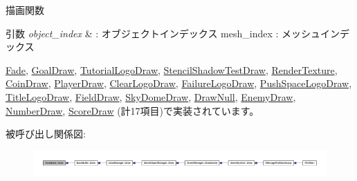 描画関数 


\begin{DoxyParams}{引数}
{\em object\+\_\+index} & \+: オブジェクトインデックス mesh\+\_\+index \+: メッシュインデックス \\
\hline
\end{DoxyParams}


\mbox{\hyperlink{class_fade_a84a9e688650ac500e03cde74ff0210b8}{Fade}}, \mbox{\hyperlink{class_goal_draw_a554c826d7a4534ee489dfe18edf7ee0e}{Goal\+Draw}}, \mbox{\hyperlink{class_tutorial_logo_draw_aa808cfb8bc59d58bbd698a195603429f}{Tutorial\+Logo\+Draw}}, \mbox{\hyperlink{class_stencil_shadow_test_draw_abb5f9445b7d94c213a3751fa57e36643}{Stencil\+Shadow\+Test\+Draw}}, \mbox{\hyperlink{class_render_texture_a529ab829c676470ae5764b42cba9efb0}{Render\+Texture}}, \mbox{\hyperlink{class_coin_draw_ac7d91fecb6845cebe276eb81a4953563}{Coin\+Draw}}, \mbox{\hyperlink{class_player_draw_a8b9e8caa6bea7295f58a0aaddeb9458b}{Player\+Draw}}, \mbox{\hyperlink{class_clear_logo_draw_ab018f370071f370ae7016d8ee402c456}{Clear\+Logo\+Draw}}, \mbox{\hyperlink{class_failure_logo_draw_a8ee20e1697bbbaf7f41c18334830488a}{Failure\+Logo\+Draw}}, \mbox{\hyperlink{class_push_space_logo_draw_a647dddefc43d66cb3c720ee8fbb6a783}{Push\+Space\+Logo\+Draw}}, \mbox{\hyperlink{class_title_logo_draw_a01e4cb21d580bac86a226fa2e35bf4a3}{Title\+Logo\+Draw}}, \mbox{\hyperlink{class_field_draw_a1915497654d079074dbd3e058db06a78}{Field\+Draw}}, \mbox{\hyperlink{class_sky_dome_draw_a42364ea42618cbab588d55050edfe95a}{Sky\+Dome\+Draw}}, \mbox{\hyperlink{class_draw_null_afe50f6fd820b18d673f70f048743f339}{Draw\+Null}}, \mbox{\hyperlink{class_enemy_draw_a20a23c1c5fd5e510d15e8ca27aabd821}{Enemy\+Draw}}, \mbox{\hyperlink{class_number_draw_a15e4e602b3f9372349d0b6ff9e4fc423}{Number\+Draw}}, \mbox{\hyperlink{class_score_draw_a799e71943140a264cedba6002308b976}{Score\+Draw}} (計17項目)で実装されています。

被呼び出し関係図\+:
\nopagebreak
\begin{figure}[H]
\begin{center}
\leavevmode
\includegraphics[width=350pt]{class_draw_base_a408080106630a1146d7af0bb46a4d8d1_icgraph}
\end{center}
\end{figure}
\mbox{\label{class_draw_base_a4e36184dbb605bcae13bfb38722ddc24}} 
